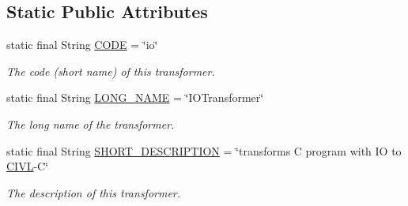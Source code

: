 \subsection*{Static Public Attributes}
\begin{DoxyCompactItemize}
\item 
\hypertarget{classedu_1_1udel_1_1cis_1_1vsl_1_1civl_1_1transform_1_1IF_1_1IOTransformer_aa72124793e4fc926b7f907c5eb9cb744}{}static final String \hyperlink{classedu_1_1udel_1_1cis_1_1vsl_1_1civl_1_1transform_1_1IF_1_1IOTransformer_aa72124793e4fc926b7f907c5eb9cb744}{C\+O\+D\+E} = \char`\"{}io\char`\"{}\label{classedu_1_1udel_1_1cis_1_1vsl_1_1civl_1_1transform_1_1IF_1_1IOTransformer_aa72124793e4fc926b7f907c5eb9cb744}

\begin{DoxyCompactList}\small\item\em The code (short name) of this transformer. \end{DoxyCompactList}\item 
\hypertarget{classedu_1_1udel_1_1cis_1_1vsl_1_1civl_1_1transform_1_1IF_1_1IOTransformer_a82e4543e0d02e1688cbb366059525f8f}{}static final String \hyperlink{classedu_1_1udel_1_1cis_1_1vsl_1_1civl_1_1transform_1_1IF_1_1IOTransformer_a82e4543e0d02e1688cbb366059525f8f}{L\+O\+N\+G\+\_\+\+N\+A\+M\+E} = \char`\"{}I\+O\+Transformer\char`\"{}\label{classedu_1_1udel_1_1cis_1_1vsl_1_1civl_1_1transform_1_1IF_1_1IOTransformer_a82e4543e0d02e1688cbb366059525f8f}

\begin{DoxyCompactList}\small\item\em The long name of the transformer. \end{DoxyCompactList}\item 
\hypertarget{classedu_1_1udel_1_1cis_1_1vsl_1_1civl_1_1transform_1_1IF_1_1IOTransformer_af4b0e106798badc175556da41adf5279}{}static final String \hyperlink{classedu_1_1udel_1_1cis_1_1vsl_1_1civl_1_1transform_1_1IF_1_1IOTransformer_af4b0e106798badc175556da41adf5279}{S\+H\+O\+R\+T\+\_\+\+D\+E\+S\+C\+R\+I\+P\+T\+I\+O\+N} = \char`\"{}transforms C program with I\+O to \hyperlink{classedu_1_1udel_1_1cis_1_1vsl_1_1civl_1_1CIVL}{C\+I\+V\+L}-\/C\char`\"{}\label{classedu_1_1udel_1_1cis_1_1vsl_1_1civl_1_1transform_1_1IF_1_1IOTransformer_af4b0e106798badc175556da41adf5279}

\begin{DoxyCompactList}\small\item\em The description of this transformer. \end{DoxyCompactList}\end{DoxyCompactItemize}



